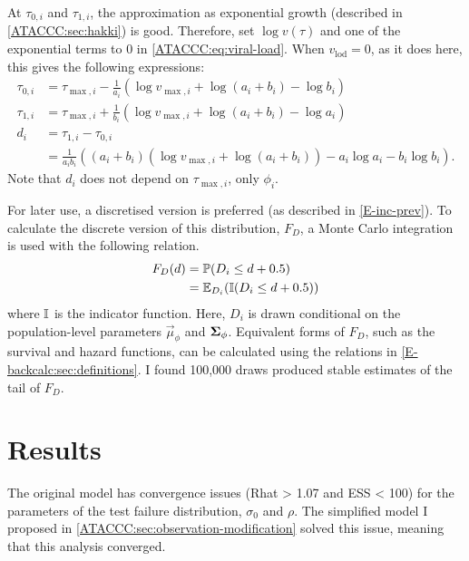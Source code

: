 \documentclass[thesis.tex]{subfiles}
\begin{document}
At $\tau_{0,i}$ and $\tau_{1,i}$, the approximation as exponential growth (described in \cref{ATACCC:sec:hakki}) is good.
Therefore, set $\log v(\tau)$ and one of the exponential terms to 0 in \cref{ATACCC:eq:viral-load}.
When $v_\text{lod} = 0$, as it does here, this gives the following expressions:
$$
\begin{aligned}
\tau_{0,i}
&= \tau_{\max,i} - \frac{1}{a_i} \left(\log v_{\max,i} + \log(a_i + b_i) - \log b_i \right) \\
\tau_{1,i}
&= \tau_{\max,i} + \frac{1}{b_i} \left(\log v_{\max,i} + \log(a_i + b_i) - \log a_i \right) \\
d_i
&= \tau_{1,i} - \tau_{0,i}  \\
&= \frac{1}{a_i b_i} \left( (a_i + b_i) (\log v_{\max,i} + \log(a_i + b_i)) - a_i \log a_i - b_i \log b_i \right).
\end{aligned}
$$
Note that $d_i$ does not depend on $\tau_{\max,i}$, only $\phi_i$.

For later use, a discretised version is preferred (as described in \cref{E-inc-prev}).
To calculate the discrete version of this distribution, $F_D$, a Monte Carlo integration is used with the following relation.
\begin{align}
  F_D(d)
  &= \operatorname{\mathbb{P}}(D_i \leq d + 0.5) \\
  &= \operatorname{\mathbb{E}}_{D_i}(\operatorname{\mathbb{I}}(D_i \leq d + 0.5)) 
\end{align}
where $\operatorname{\mathbb{I}}$ is the indicator function.
Here, $D_i$ is drawn conditional on the population-level parameters $\vec{\mu}_\phi$ and $\bm{\Sigma}_\phi$.
Equivalent forms of $F_D$, such as the survival and hazard functions, can be calculated using the relations in \cref{E-backcalc:sec:definitions}.
I found 100,000 draws produced stable estimates of the tail of $F_D$.

\section{Results} \label{ATACCC:sec:results-discussion}


The original \textcite{hakkiOnset} model has convergence issues (Rhat > 1.07 and ESS < 100) for the parameters of the test failure distribution, $\sigma_0$ and $\rho$.
The simplified model I proposed in \cref{ATACCC:sec:observation-modification} solved this issue, meaning that this analysis converged.
\end{document}
